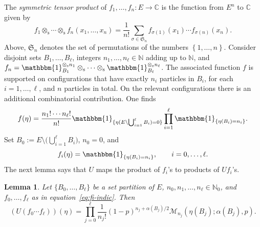 \documentclass[pdftex]{sigma}
\numberwithin{equation}{section}
\newtheorem{Lemma}[Theorem]{Lemma}
\newcommand{\N}{\mathbb{N}}
\newcommand{\C}{\mathbb{C}}
\newcommand{\set}[1]{{\left \{ #1 \right \}}}
\newcommand{\1}{\mathbbm{1}}
\begin{document}
The \emph{symmetric tensor product} of $f_1,\ldots, f_n\colon E\to \C$ is the function from $E^n$ to $\C$ given by
\[
	f_1\otimes_\mathrm s \cdots \otimes_\mathrm s f_n(x_1,\ldots,x_n) = \frac{1}{n!}\sum_{\sigma\in \mathfrak S_n} f_{\sigma(1)}(x_1)\cdots f_{\sigma(n)}(x_n).
\]
Above, $\mathfrak{S}_n$ denotes the set of permutations of the numbers $\set{1, \ldots, n}$.
Consider disjoint sets $B_1,\ldots, B_\ell$, integers $n_1,\ldots, n_\ell\in \N$ adding up to $\N$, and $f_n =\1_{B_1}^{\otimes_\mathrm s n_1} \otimes_\mathrm s \cdots \otimes_\mathrm s \1_{B_\ell}^{\otimes_\mathrm s n_\ell}$. The associated function $f$ is supported on configurations that have exactly $n_i$ particles in $B_i$, for each $i=1,\ldots,\ell$, and $n$ particles in total. On the relevant configurations there is an additional combinatorial contribution. One finds
\begin{equation}\label{eq:tenso-indic}
	f(\eta) = \frac{n_1!\cdots n_\ell!}{n!} \1_{\{\eta(E\setminus \bigcup_{i=1}^\ell B_i)=0\}} \prod_{i=1}^\ell\1_{\{\eta(B_i) = n_i\}}.
\end{equation}
Set $B_0:= E\setminus \bigl(\bigcup_{i=1}^\ell B_i\bigr)$, $n_0=0$, and
\begin{equation} \label{eq:fi-indic}
	f_i(\eta) = \1_{\{\eta(B_i)=n_i \}},\qquad i =0,\ldots,\ell.
\end{equation}
The next lemma says that $U$ maps the product of $f_i$'s to products of $U f_i$'s.

\begin{Lemma} \label{lem:tensorize}
	Let $\{B_0,\ldots, B_{\ell}\}$ be a set partition of $E$, $n_0,n_1,\ldots,n_\ell \in \N_0$, and $f_0,\ldots,f_\ell$ as in equation~\eqref{eq:fi-indic}. Then
	\[
		( U (f_0\cdots f_\ell)) (\eta) =\prod_{j=0}^\ell \frac{1}{n_j!} (1-p)^{n_j+ \alpha(B_j)/2 } \mathcal M_{n_j}( \eta(B_j);\alpha(B_j), p).
	\] 	
\end{Lemma}
\end{document}
